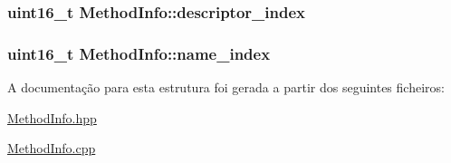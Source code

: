 \subsubsection[{\texorpdfstring{descriptor\+\_\+index}{descriptor_index}}]{\setlength{\rightskip}{0pt plus 5cm}uint16\+\_\+t Method\+Info\+::descriptor\+\_\+index}\hypertarget{struct_method_info_a427ffc223f3b52b4d83fa6ee9e411089}{}\label{struct_method_info_a427ffc223f3b52b4d83fa6ee9e411089}
\subsubsection[{\texorpdfstring{name\+\_\+index}{name_index}}]{\setlength{\rightskip}{0pt plus 5cm}uint16\+\_\+t Method\+Info\+::name\+\_\+index}\hypertarget{struct_method_info_afaa8591bae9244b2b47609e4919e4dbe}{}\label{struct_method_info_afaa8591bae9244b2b47609e4919e4dbe}


A documentação para esta estrutura foi gerada a partir dos seguintes ficheiros\+:\begin{DoxyCompactItemize}
\item 
\hyperlink{_method_info_8hpp}{Method\+Info.\+hpp}\item 
\hyperlink{_method_info_8cpp}{Method\+Info.\+cpp}\end{DoxyCompactItemize}
